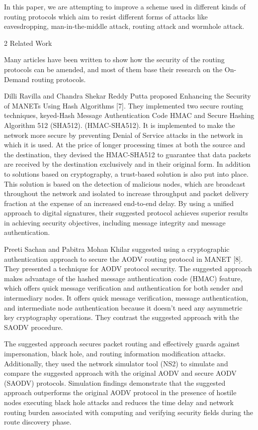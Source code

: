 \documentclass{default}
\begin{document}
In this paper, we are attempting to improve a scheme used in different kinds of routing protocols which aim to resist different forms of attacks like eavesdropping, man-in-the-middle attack, routing attack and wormhole attack.

2 Related Work

Many articles have been written to show how the security of the routing protocols can be amended, and most of them base their research on the On-Demand routing protocols.

Dilli Ravilla and Chandra Shekar Reddy Putta proposed Enhancing the Security of MANETs Using Hash Algorithms [7]. They implemented two secure routing techniques, keyed-Hash Message Authentication Code HMAC and Secure Hashing Algorithm 512 (SHA512). (HMAC-SHA512). It is implemented to make the network more secure by preventing Denial of Service attacks in the network in which it is used. At the price of longer processing times at both the source and the destination, they devised the HMAC-SHA512 to guarantee that data packets are received by the destination exclusively and in their original form. In addition to solutions based on cryptography, a trust-based solution is also put into place. This solution is based on the detection of malicious nodes, which are broadcast throughout the network and isolated to increase throughput and packet delivery fraction at the expense of an increased end-to-end delay. By using a unified approach to digital signatures, their suggested protocol achieves superior results in achieving security objectives, including message integrity and message authentication.

Preeti Sachan and Pabitra Mohan Khilar suggested using a cryptographic authentication approach to secure the AODV routing protocol in MANET [8]. They presented a technique for AODV protocol security. The suggested approach makes advantage of the hashed message authentication code (HMAC) feature, which offers quick message verification and authentication for both sender and intermediary nodes. It offers quick message verification, message authentication, and intermediate node authentication because it doesn't need any asymmetric key cryptography operations. They contrast the suggested approach with the SAODV procedure.

The suggested approach secures packet routing and effectively guards against impersonation, black hole, and routing information modification attacks. Additionally, they used the network simulator tool (NS2) to simulate and compare the suggested approach with the original AODV and secure AODV (SAODV) protocols. Simulation findings demonstrate that the suggested approach outperforms the original AODV protocol in the presence of hostile nodes executing black hole attacks and reduces the time delay and network routing burden associated with computing and verifying security fields during the route discovery phase.
\end{document}
